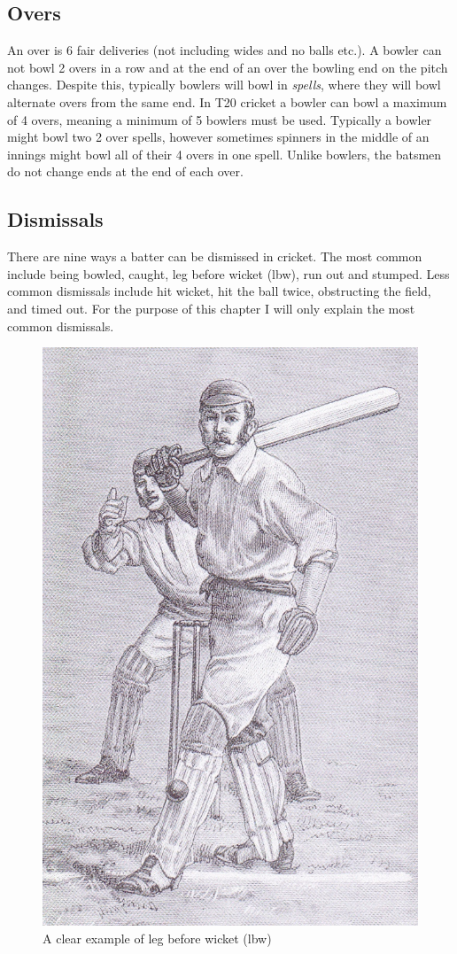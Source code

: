 \documentclass[12pt,a4paper]{report}
\theoremstyle{definition}
\begin{document}
\subsection{Overs} \label{sec:Overs}

An over is 6 fair deliveries (not including wides and no balls etc.).
A bowler can not bowl 2 overs in a row and at the end of an over the bowling end on the pitch changes. 
Despite this, typically bowlers will bowl in \emph{spells}, where they will bowl alternate overs from the same end.
In T20 cricket a bowler can bowl a maximum of 4 overs, meaning a minimum of 5 bowlers must be used. 
Typically a bowler might bowl two 2 over spells, however sometimes spinners in the middle of an innings might bowl all of their 4 overs in one spell.
Unlike bowlers, the batsmen do not change ends at the end of each over. 

\subsection{Dismissals} \label{sec:Dismissals}

There are nine ways a batter can be dismissed in cricket. 
The most common include being bowled, caught, leg before wicket (lbw), run out and stumped. 
Less common dismissals include hit wicket, hit the ball twice, obstructing the field, and timed out. 
For the purpose of this chapter I will only explain the most common dismissals. 

\begin{figure}[H]
    \centering
    \includegraphics[width=0.8\linewidth]{Leg_before_wicket.jpg}
    \caption{A clear example of leg before wicket (lbw) \citep{lbwWiki}}
    \label{fig:lbw}
\end{figure}
\end{document}
